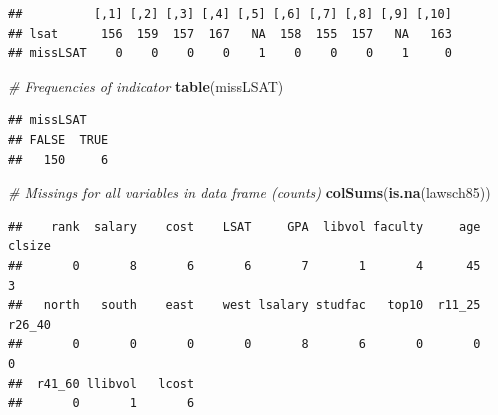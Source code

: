 \documentclass[]{book}
\newenvironment{Shaded}{\begin{snugshade}}{\end{snugshade}}
\newcommand{\CommentTok}[1]{\textcolor[rgb]{0.56,0.35,0.01}{\textit{#1}}}
\newcommand{\DataTypeTok}[1]{\textcolor[rgb]{0.13,0.29,0.53}{#1}}
\newcommand{\DecValTok}[1]{\textcolor[rgb]{0.00,0.00,0.81}{#1}}
\newcommand{\KeywordTok}[1]{\textcolor[rgb]{0.13,0.29,0.53}{\textbf{#1}}}
\newcommand{\NormalTok}[1]{#1}
\newcommand{\OperatorTok}[1]{\textcolor[rgb]{0.81,0.36,0.00}{\textbf{#1}}}
\newcommand{\StringTok}[1]{\textcolor[rgb]{0.31,0.60,0.02}{#1}}
\begin{document}
\begin{Shaded}
\end{Shaded}

\begin{verbatim}
##          [,1] [,2] [,3] [,4] [,5] [,6] [,7] [,8] [,9] [,10]
## lsat      156  159  157  167   NA  158  155  157   NA   163
## missLSAT    0    0    0    0    1    0    0    0    1     0
\end{verbatim}

\begin{Shaded}
\begin{Highlighting}[]
\CommentTok{# Frequencies of indicator}
\KeywordTok{table}\NormalTok{(missLSAT)}
\end{Highlighting}
\end{Shaded}

\begin{verbatim}
## missLSAT
## FALSE  TRUE 
##   150     6
\end{verbatim}

\begin{Shaded}
\begin{Highlighting}[]
\CommentTok{# Missings for all variables in data frame (counts)}
\KeywordTok{colSums}\NormalTok{(}\KeywordTok{is.na}\NormalTok{(lawsch85))}
\end{Highlighting}
\end{Shaded}

\begin{verbatim}
##    rank  salary    cost    LSAT     GPA  libvol faculty     age  clsize 
##       0       8       6       6       7       1       4      45       3 
##   north   south    east    west lsalary studfac   top10  r11_25  r26_40 
##       0       0       0       0       8       6       0       0       0 
##  r41_60 llibvol   lcost 
##       0       1       6
\end{verbatim}
\end{document}
